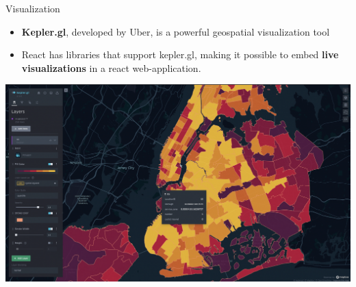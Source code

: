 \documentclass{beamer}
\begin{document}
\begin{frame}{Visualization}
\begin{itemize}
    \item \textbf{Kepler.gl}, developed by Uber, is a powerful geospatial visualization tool
    \item React has libraries that support kepler.gl, making it possible to embed \textbf{live visualizations} in a react web-application.
\end{itemize}
\begin{center}
    \includegraphics[width=0.60\linewidth]{documentation/project_presentation/figures/keplerpolygon.png} \\
\end{center}
\end{frame}
\end{document}
